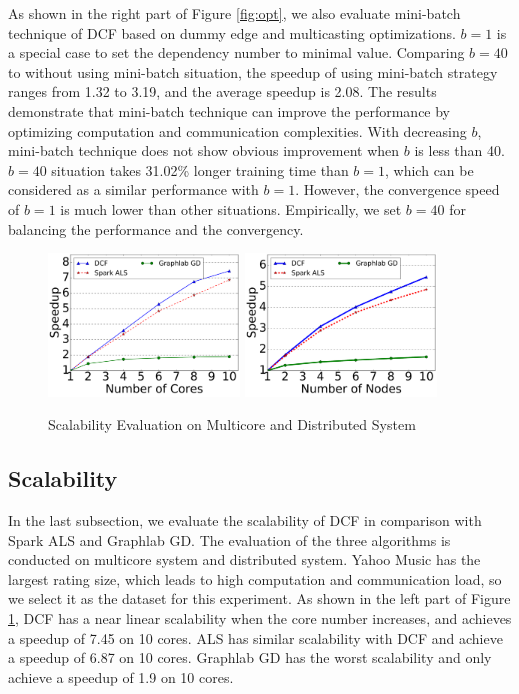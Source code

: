 \documentclass{llncs}
\begin{document}
As shown in the right part of Figure \ref{fig:opt}, we also evaluate mini-batch technique of DCF based on dummy edge and multicasting optimizations. $b = 1$ is a special case to set the dependency number to minimal value. Comparing $b=40$ to without using mini-batch situation, the speedup of using mini-batch strategy ranges from 1.32 to 3.19, and the average speedup is 2.08. The results demonstrate that mini-batch technique can improve the performance by optimizing computation and communication complexities. With decreasing $b$, mini-batch technique does not show obvious improvement when $b$ is less than 40. $b=40$ situation takes 31.02\% longer training time than $b=1$, which can be considered as a similar performance with $b=1$. However, the convergence speed of $b=1$ is much lower than other situations. Empirically, we set $b=40$ for balancing the performance and the convergency.

\begin{figure}[!t]
\centering
\includegraphics[width=2in]{pics/core.pdf}
\includegraphics[width=2in]{pics/node.pdf}
\vspace{-10pt}
\caption{Scalability Evaluation on Multicore and Distributed System}
\vspace{-15pt}
\label{fig:core}
\end{figure}

\vspace{-15pt}
\subsection{Scalability}
\vspace{-5pt}
\label{sub:sca}

In the last subsection, we evaluate the scalability of DCF in comparison with Spark ALS and Graphlab GD. The evaluation of the three algorithms is conducted on multicore system and distributed system. Yahoo Music has the largest rating size, which leads to high computation and communication load, so we select it as the dataset for this experiment. As shown in the left part of Figure \ref{fig:core}, DCF has a near linear scalability when the core number increases, and achieves a speedup of 7.45 on 10 cores. ALS has similar scalability with DCF and achieve a speedup of 6.87 on 10 cores. Graphlab GD has the worst scalability and only achieve a speedup of 1.9 on 10 cores.
\end{document}
